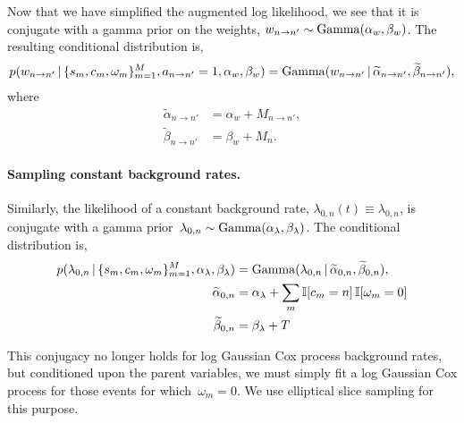 Now that we have simplified the augmented log likelihood, we see that it is
conjugate with a gamma prior on the weights,
${w_{n \to n'}\sim \mathrm{Gamma}(\alpha_w, \beta_w})$.
The resulting conditional distribution is,
\begin{multline*}
  p(w_{n \to n'}\,|\, \{s_m,c_m,\omega_m\}_{m=1}^M, a_{n\to n'}=1, \alpha_w, \beta_w)
  = 
  \mathrm{Gamma}(w_{n \to n'} \,|\, \widetilde{\alpha}_{n \to n'}, \widetilde{\beta}_{n \to n'}),
\end{multline*}
where
\begin{align*}
  \widetilde{\alpha}_{n \to n'} &= \alpha_w + M_{n \to n'}, \\
  \widetilde{\beta}_{n \to n'} &= \beta_w + M_n.
\end{align*}


\paragraph{Sampling constant background rates.}
Similarly, the likelihood of a constant background rate,
${\lambda_{0,n}(t)\equiv\lambda_{0,n}}$, is conjugate with a gamma
prior~${\lambda_{0,n} \sim
  \mathrm{Gamma}(\alpha_{\lambda},\beta_{\lambda})}$.  The conditional
distribution is,
\begin{align*}
  p(\lambda_{0,n} \,|\, \{s_m,c_m, \omega_m\}_{m=1}^M, \alpha_\lambda, \beta_\lambda)
  &=
  \mathrm{Gamma}(\lambda_{0,n} \,|\, \widetilde{\alpha}_{0,n},  \widetilde{\beta}_{0,n}),\\
  \widetilde{\alpha}_{0,n} &= \alpha_{\lambda} + \sum_m \mathbb{I}[c_m = n] \, \mathbb{I}[\omega_m=0] \\
  \widetilde{\beta}_{0,n} &= \beta_\lambda + T
\end{align*}

This conjugacy no longer holds for log Gaussian Cox process background
rates, but conditioned upon the parent variables, we must simply fit a
log Gaussian Cox process for those events for which~${\omega_m=0}$. We use
elliptical slice sampling \cite{Murray-2010} for this purpose.

